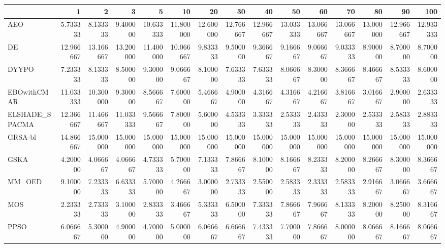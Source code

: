 \begin{tabular}{lrrrrrrrrrrrrrr}
\toprule
{} &        1   &        2   &        3   &        5   &        10  &        20  &        30  &        40  &        50  &        60  &        70  &        80  &        90  &        100 \\
\midrule
AEO            &   5.733333 &   8.133333 &   9.400000 &  10.633333 &  11.800000 &  12.600000 &  12.766667 &  12.966667 &  13.033333 &  13.066667 &  13.066667 &  13.000000 &  12.966667 &  12.933333 \\
DE             &  12.966667 &  13.166667 &  13.200000 &  11.400000 &  10.066667 &   9.833333 &   9.500000 &   9.366667 &   9.166667 &   9.066667 &   9.033333 &   8.900000 &   8.700000 &   8.700000 \\
DYYPO          &   7.233333 &   8.133333 &   8.500000 &   9.300000 &   9.066667 &   8.100000 &   7.633333 &   7.633333 &   8.066667 &   8.300000 &   8.366667 &   8.466667 &   8.533333 &   8.600000 \\
EBOwithCMAR    &  11.033333 &  10.300000 &   9.300000 &   8.566667 &   7.600000 &   5.466667 &   4.900000 &   4.316667 &   4.316667 &   4.216667 &   3.816667 &   3.016667 &   2.900000 &   2.633333 \\
ELSHADE\_SPACMA &  12.366667 &  11.466667 &  11.033333 &   9.566667 &   7.800000 &   5.600000 &   4.533333 &   3.333333 &   2.533333 &   2.433333 &   2.300000 &   2.533333 &   2.583333 &   2.883333 \\
GRSA-bl        &  14.866667 &  15.000000 &  15.000000 &  15.000000 &  15.000000 &  15.000000 &  15.000000 &  15.000000 &  15.000000 &  15.000000 &  15.000000 &  15.000000 &  15.000000 &  15.000000 \\
GSKA           &   4.200000 &   4.066667 &   4.066667 &   4.733333 &   5.700000 &   7.133333 &   7.866667 &   8.100000 &   8.166667 &   8.233333 &   8.200000 &   8.266667 &   8.300000 &   8.366667 \\
MM\_OED         &   9.100000 &   7.233333 &   6.633333 &   5.700000 &   4.266667 &   3.000000 &   2.733333 &   2.550000 &   2.583333 &   2.333333 &   2.583333 &   2.916667 &   3.066667 &   3.666667 \\
MOS            &   2.233333 &   2.733333 &   3.100000 &   2.833333 &   3.466667 &   5.333333 &   6.500000 &   7.333333 &   7.866667 &   7.966667 &   8.133333 &   8.200000 &   8.250000 &   8.316667 \\
PPSO           &   6.066667 &   5.300000 &   4.900000 &   4.700000 &   5.000000 &   6.066667 &   6.666667 &   7.433333 &   7.700000 &   7.866667 &   8.000000 &   8.066667 &   8.166667 &   8.066667 \\

\end{tabular}
